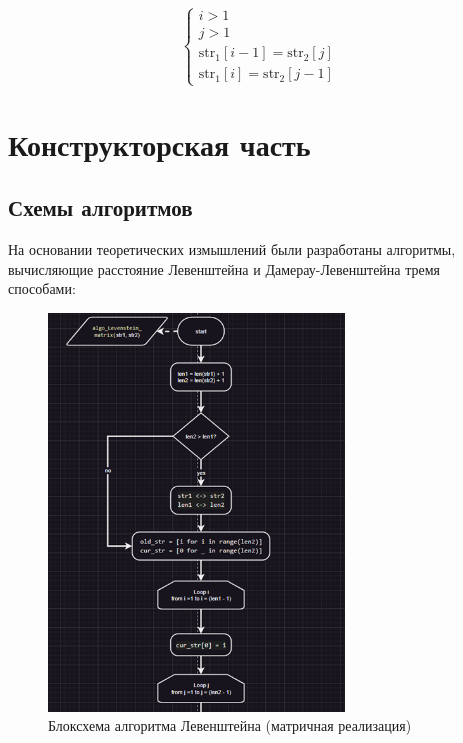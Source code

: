 \documentclass[a4paper,12pt]{article}
\begin{document}
\[
\begin{cases}
i > 1 \\
j > 1 \\
\text{str}_1[i-1] = \text{str}_2[j] \\
\text{str}_1[i] = \text{str}_2[j-1]
\end{cases}
\]
\newpage

\section{Конструкторская часть}
\subsection*{Схемы алгоритмов}
На основании теоретических измышлений были разработаны алгоритмы, вычисляющие расстояние Левенштейна и Дамерау-Левенштейна тремя способами:\\
\begin{figure}[H]
    \centering
    \includegraphics[width=0.7\textwidth]{block_1_1_1.png}
    \caption{Блоксхема алгоритма Левенштейна (матричная реализация)}
\end{figure}
\end{document}
